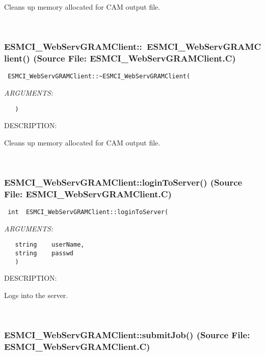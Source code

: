       Cleans up memory allocated for CAM output file.
   
 
\mbox{}\hrulefill\
 
\subsubsection{ESMCI\_WebServGRAMClient::~ESMCI\_WebServGRAMClient() (Source File: ESMCI\_WebServGRAMClient.C)}


  
\begin{verbatim} ESMCI_WebServGRAMClient::~ESMCI_WebServGRAMClient(\end{verbatim}{\em ARGUMENTS:}
\begin{verbatim}   )\end{verbatim}
{\sf DESCRIPTION:\\ }


      Cleans up memory allocated for CAM output file.
   
 
\mbox{}\hrulefill\
 
\subsubsection{ESMCI\_WebServGRAMClient::loginToServer() (Source File: ESMCI\_WebServGRAMClient.C)}


  
\begin{verbatim} int  ESMCI_WebServGRAMClient::loginToServer(\end{verbatim}{\em ARGUMENTS:}
\begin{verbatim}   string    userName,
   string    passwd
   )\end{verbatim}
{\sf DESCRIPTION:\\ }


      Logs into the server.
   
 
\mbox{}\hrulefill\
 
\subsubsection{ESMCI\_WebServGRAMClient::submitJob() (Source File: ESMCI\_WebServGRAMClient.C)}



